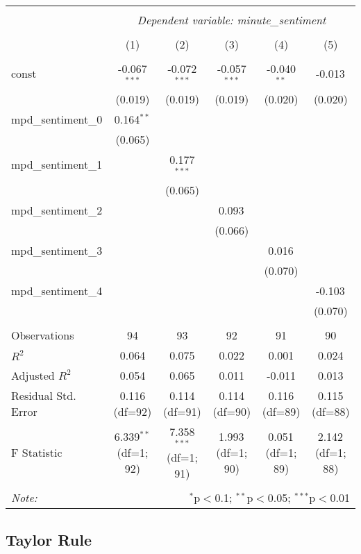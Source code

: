 \documentclass{article}
\begin{document}
\begin{table}[H]
\centering
\begin{tabular}{@{}lccccc@{}}
\\[-1.8ex]\hline
\hline \\[-1.8ex]
& \multicolumn{5}{c}{\textit{Dependent variable: minute\_sentiment}} \\
\cline{2-6}
\\[-1.8ex] & (1) & (2) & (3) & (4) & (5) \\
\hline \\[-1.8ex]
const & -0.067$^{***}$ & -0.072$^{***}$ & -0.057$^{***}$ & -0.040$^{**}$ & -0.013$^{}$ \\
& (0.019) & (0.019) & (0.019) & (0.020) & (0.020) \\
mpd\_sentiment\_0 & 0.164$^{**}$ & & & & \\
& (0.065) & & & & \\
mpd\_sentiment\_1 & & 0.177$^{***}$ & & & \\
& & (0.065) & & & \\
mpd\_sentiment\_2 & & & 0.093$^{}$ & & \\
& & & (0.066) & & \\
mpd\_sentiment\_3 & & & & 0.016$^{}$ & \\
& & & & (0.070) & \\
mpd\_sentiment\_4 & & & & & -0.103$^{}$ \\
& & & & & (0.070) \\
\hline \\[-1.8ex]
Observations & 94 & 93 & 92 & 91 & 90 \\
$R^2$ & 0.064 & 0.075 & 0.022 & 0.001 & 0.024 \\
Adjusted $R^2$ & 0.054 & 0.065 & 0.011 & -0.011 & 0.013 \\
Residual Std. Error & 0.116 (df=92) & 0.114 (df=91) & 0.114 (df=90) & 0.116 (df=89) & 0.115 (df=88) \\
F Statistic & 6.339$^{**}$ (df=1; 92) & 7.358$^{***}$ (df=1; 91) & 1.993$^{}$ (df=1; 90) & 0.051$^{}$ (df=1; 89) & 2.142$^{}$ (df=1; 88) \\
\hline
\hline \\[-1.8ex]
\textit{Note:} & \multicolumn{5}{r}{$^{*}$p$<$0.1; $^{**}$p$<$0.05; $^{***}$p$<$0.01} \\
\end{tabular}
\end{table}


\subsection{Taylor Rule}
\end{document}

